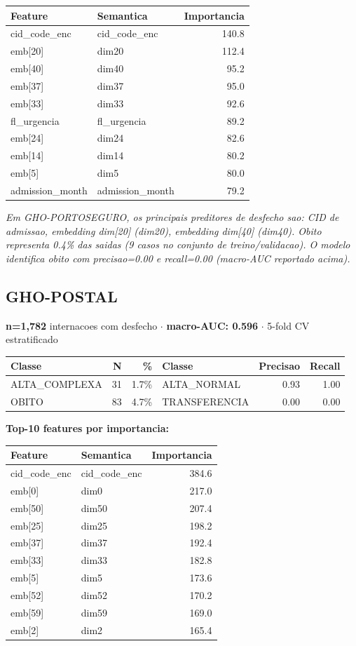 \documentclass[11pt,a4paper]{article}
\begin{document}
\begin{tabular}{llr}
\toprule
Feature & Semantica & Importancia \\
\midrule
cid\_code\_enc & cid\_code\_enc & 140.8 \\
emb[20] & dim20 & 112.4 \\
emb[40] & dim40 & 95.2 \\
emb[37] & dim37 & 95.0 \\
emb[33] & dim33 & 92.6 \\
fl\_urgencia & fl\_urgencia & 89.2 \\
emb[24] & dim24 & 82.6 \\
emb[14] & dim14 & 80.2 \\
emb[5] & dim5 & 80.0 \\
admission\_month & admission\_month & 79.2 \\
\bottomrule
\end{tabular}

\vspace{4pt}\noindent\textit{Em GHO-PORTOSEGURO, os principais preditores de desfecho sao: CID de admissao, embedding dim[20] (dim20), embedding dim[40] (dim40). Obito representa 0.4\% das saidas (9 casos no conjunto de treino/validacao). O modelo identifica obito com precisao=0.00 e recall=0.00 (macro-AUC reportado acima).}

\subsection{GHO-POSTAL}
\textbf{n=1,782} internacoes com desfecho $\cdot$ \textbf{macro-AUC: 0.596} $\cdot$ 5-fold CV estratificado

\begin{tabular}{lrr|lrr}
\toprule
Classe & N & \% & Classe & Precisao & Recall \\
\midrule
ALTA\_COMPLEXA & 31 & 1.7\% & ALTA\_NORMAL & 0.93 & 1.00 \\
OBITO & 83 & 4.7\% & TRANSFERENCIA & 0.00 & 0.00 \\
\bottomrule
\end{tabular}

\vspace{4pt}\noindent\textbf{Top-10 features por importancia:}

\begin{tabular}{llr}
\toprule
Feature & Semantica & Importancia \\
\midrule
cid\_code\_enc & cid\_code\_enc & 384.6 \\
emb[0] & dim0 & 217.0 \\
emb[50] & dim50 & 207.4 \\
emb[25] & dim25 & 198.2 \\
emb[37] & dim37 & 192.4 \\
emb[33] & dim33 & 182.8 \\
emb[5] & dim5 & 173.6 \\
emb[52] & dim52 & 170.2 \\
emb[59] & dim59 & 169.0 \\
emb[2] & dim2 & 165.4 \\
\bottomrule
\end{tabular}
\end{document}
